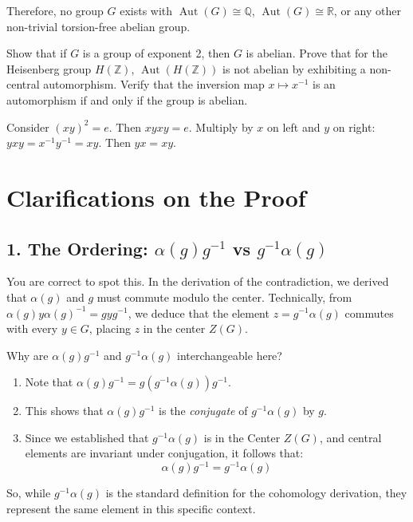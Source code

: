 \documentclass{book}
\newcommand{\Q}{{\mathbb{Q}}}
\newcommand{\R}{{\mathbb{R}}}
\newcommand{\Z}{{\mathbb{Z}}}
\newcommand{\Aut}{{\operatorname{Aut}}}
\begin{document}
Therefore, no group $G$ exists with $\Aut(G) \cong \Q$, $\Aut(G) \cong \R$, or any other non-trivial torsion-free abelian group.

\begin{Exercise}[label=ex:AutoGroups]
  \Question Show that if $G$ is a group of exponent 2, then $G$ is abelian.
  \Question Prove that for the Heisenberg group $H(\Z)$, $\Aut(H(\Z))$ is not abelian by exhibiting a non-central automorphism.
  \Question Verify that the inversion map $x \mapsto x^{-1}$ is an automorphism if and only if the group is abelian.
\end{Exercise}
\begin{Answer}[ref={ex:AutoGroups}]
  \Question Consider $(xy)^2 = e$. Then $xyxy = e$. Multiply by $x$ on left and $y$ on right: $yxy = x^{-1}y^{-1} = xy$. Then $yx = xy$.
\end{Answer}


\section*{Clarifications on the Proof}

\subsection*{1. The Ordering: $\alpha(g)g^{-1}$ vs $g^{-1}\alpha(g)$}

You are correct to spot this. In the derivation of the contradiction, we derived that $\alpha(g)$ and $g$ must commute modulo the center.
Technically, from $\alpha(g)y\alpha(g)^{-1} = gyg^{-1}$, we deduce that the element $z = g^{-1}\alpha(g)$ commutes with every $y \in G$, placing $z$ in the center $Z(G)$.

Why are $\alpha(g)g^{-1}$ and $g^{-1}\alpha(g)$ interchangeable here?
\begin{enumerate}
    \item Note that $\alpha(g)g^{-1} = g(g^{-1}\alpha(g))g^{-1}$.
    \item This shows that $\alpha(g)g^{-1}$ is the \emph{conjugate} of $g^{-1}\alpha(g)$ by $g$.
    \item Since we established that $g^{-1}\alpha(g)$ is in the Center $Z(G)$, and central elements are invariant under conjugation, it follows that:
    \[ \alpha(g)g^{-1} = g^{-1}\alpha(g) \]
\end{enumerate}
So, while $g^{-1}\alpha(g)$ is the standard definition for the cohomology derivation, they represent the same element in this specific context.
\end{document}
